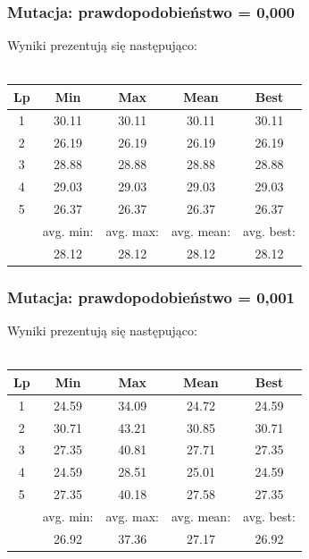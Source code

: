 \documentclass[a4paper,11pt]{article}
\begin{document}
				\subsubsection{Mutacja: prawdopodobieństwo = 0,000}
					Wyniki prezentują się następująco:\\~\\
					\begin{tabular}{|c|c|c|c|c|}
						\hline 
						Lp & Min & Max & Mean & Best \\
						\hline
						1 & 30.11 & 30.11 & 30.11 & 30.11 \\\hline
						2 & 26.19 & 26.19 & 26.19 & 26.19 \\\hline
						3 & 28.88 & 28.88 & 28.88 & 28.88 \\\hline
						4 & 29.03 & 29.03 & 29.03 & 29.03 \\\hline
						5 & 26.37 & 26.37 & 26.37 & 26.37 \\\hline
						&avg. min:&avg. max:&avg. mean:&avg. best:\\\hline
						& 28.12 & 28.12 & 28.12 & 28.12 \\\hline
						
					\end{tabular} 
				\subsubsection{Mutacja: prawdopodobieństwo = 0,001}
					Wyniki prezentują się następująco:\\~\\
					\begin{tabular}{|c|c|c|c|c|}
						\hline 
						Lp & Min & Max & Mean & Best \\
						\hline
						1 & 24.59 & 34.09 & 24.72 & 24.59 \\\hline
						2 & 30.71 & 43.21 & 30.85 & 30.71 \\\hline
						3 & 27.35 & 40.81 & 27.71 & 27.35 \\\hline
						4 & 24.59 & 28.51 & 25.01 & 24.59 \\\hline
						5 & 27.35 & 40.18 & 27.58 & 27.35 \\\hline
						&avg. min:&avg. max:&avg. mean:&avg. best:\\\hline
						& 26.92 & 37.36 & 27.17 & 26.92 \\\hline
						
					\end{tabular} 
\end{document}
